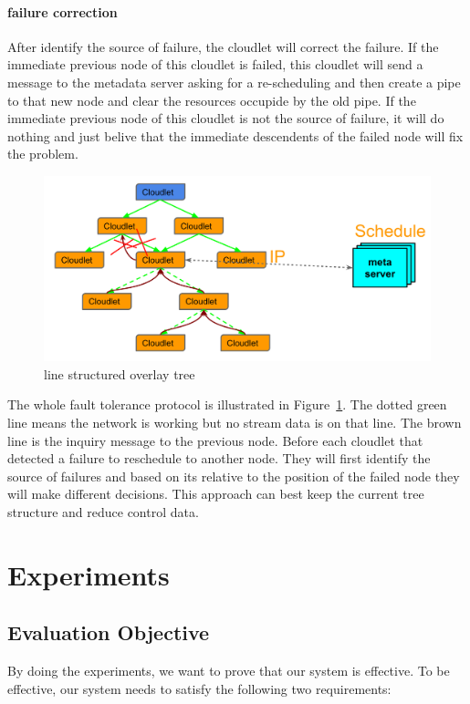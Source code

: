 \documentclass[letterpaper,twocolumn,10pt]{article}
\begin{document}
\paragraph{failure correction}
After identify the source of failure, the cloudlet will correct the failure. If the immediate previous node of this cloudlet is failed, this cloudlet will send a message to the metadata server asking for a re-scheduling and then create a pipe to that new node and clear the resources occupide by the old pipe. If the immediate previous node of this cloudlet is not the source of failure, it will do nothing and just belive that the immediate descendents of the failed node will fix the problem.

\begin{figure}[t]
\begin{center}
\includegraphics[scale=0.3]{pic/fault_tolerance.png}
\end{center}
\caption{line structured overlay tree}
\label{fig:fault_tolerance}
\end{figure}

The whole fault tolerance protocol is illustrated in Figure~\ref{fig:fault_tolerance}. The dotted green line means the network is working but no stream data is on that line. The brown line is the inquiry message to the previous node. Before each cloudlet that detected a failure to reschedule to another node. They will first identify the source of failures and based on its relative to the position of the failed node they will make different decisions. This approach can best keep the current tree structure and reduce control data.

\section{Experiments}
\subsection{Evaluation Objective}
By doing the experiments, we want to prove that our system is effective. To be effective, our system needs to satisfy the following two requirements:
\end{document}
